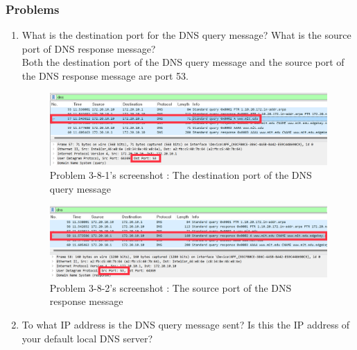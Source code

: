     \subsubsection*{Problems}
    \begin{enumerate}[label=\bfseries Problem \arabic*:,leftmargin=*,labelindent=1em]\addtocounter{enumi}{7}
        \item What is the destination port for the DNS query message? 
        What is the source port of DNS response message?\\[0.2mm]
            \soln Both the destination port of the DNS query message and the source port of the DNS response message are port 53.

            \begin{figure}[!h]\centering
                \hspace{10mm} 
        		\includegraphics[width=.79\textwidth]{image/result_week01/Q3-8-1.png}
        		\caption{\footnotesize Problem 3-8-1's screenshot : The destination port of the DNS query message}
        		\vspace{-10pt}
            \end{figure}
            \begin{figure}[!h]\centering
                \hspace{10mm} 
        		\includegraphics[width=.79\textwidth]{image/result_week01/Q3-8-2.png}
        		\caption{\footnotesize Problem 3-8-2's screenshot : The source port of the DNS response message}
        		\vspace{-10pt}
            \end{figure}
        \item To what IP address is the DNS query message sent? 
        Is this the IP address of your default local DNS server?\\[0.2mm]

\end{enumerate}
